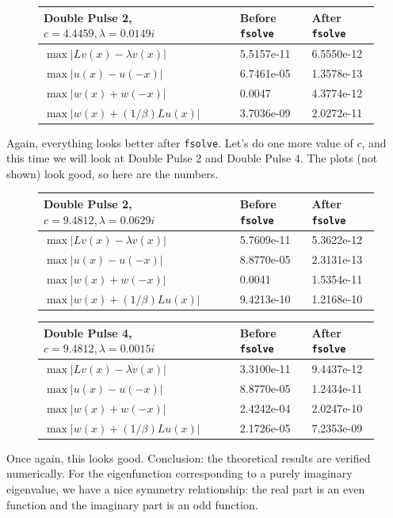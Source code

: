 \documentclass[12pt]{article}
\begin{document}
\begin{figure}[H]
\begin{tabular}{l|l|l}
 Double Pulse 2, $c = 4.4459, \lambda=0.0149i$  & Before \texttt{fsolve} & After \texttt{fsolve} \\ \hline
$\max|Lv(x) - \lambda v(x)|$  & 5.5157e-11 & 6.5550e-12 \\ 
$\max|u(x) - u(-x) |$         & 6.7461e-05 & 1.3578e-13 \\
$\max|w(x) + w(-x) |$         & 0.0047     & 4.3774e-12\\
$\max|w(x) + (1/\beta)Lu(x)|$  & 3.7036e-09 & 2.0272e-11 \\
\end{tabular}
\end{figure}
Again, everything looks better after \texttt{fsolve}. Let's do one more value of $c$, and this time we will look at Double Pulse 2 and Double Pulse 4. The plots (not shown) look good, so here are the numbers.

\begin{figure}[H]
\begin{tabular}{l|l|l}
 Double Pulse 2, $c = 9.4812, \lambda=0.0629i$  & Before \texttt{fsolve} & After \texttt{fsolve} \\ \hline
$\max|Lv(x) - \lambda v(x)|$  & 5.7609e-11 & 5.3622e-12 \\ 
$\max|u(x) - u(-x) |$         & 8.8770e-05 & 2.3131e-13 \\
$\max|w(x) + w(-x) |$         & 0.0041     & 1.5354e-11 \\
$\max|w(x) + (1/\beta)Lu(x)|$  & 9.4213e-10 & 1.2168e-10 \\
\end{tabular}
\end{figure}

\begin{figure}[H]
\begin{tabular}{l|l|l}
 Double Pulse 4, $c = 9.4812, \lambda=0.0015i$  & Before \texttt{fsolve} & After \texttt{fsolve} \\ \hline
$\max|Lv(x) - \lambda v(x)|$  & 3.3100e-11 & 9.4437e-12 \\ 
$\max|u(x) - u(-x) |$         & 8.8770e-05 & 1.2434e-11 \\
$\max|w(x) + w(-x) |$         & 2.4242e-04 & 2.0247e-10 \\
$\max|w(x) + (1/\beta)Lu(x)|$  & 2.1726e-05 & 7.2353e-09 \\
\end{tabular}
\end{figure}

Once again, this looks good. Conclusion: the theoretical results are verified numerically. For the eigenfunction corresponding to a purely imaginary eigenvalue, we have a nice symmetry relationship: the real part is an even function and the imaginary part is an odd function.
\end{document}
